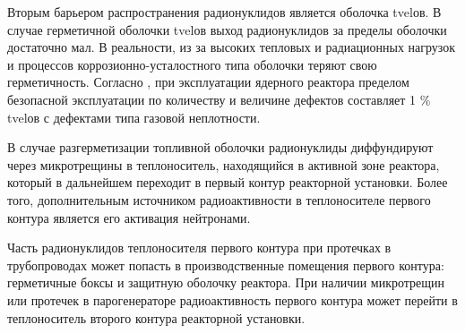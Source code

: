 Вторым барьером распространения радионуклидов является оболочка \ac{tvel}ов. В случае герметичной оболочки \ac{tvel}ов 
выход радионуклидов за пределы оболочки достаточно мал. В реальности, из за высоких тепловых и радиационных нагрузок и 
процессов коррозионно-усталостного типа оболочки теряют свою герметичность. Согласно \cite{kolpakov_tvel}, при 
эксплуатации ядерного реактора пределом безопасной эксплуатации по количеству и величине дефектов составляет 1 \% 
\ac{tvel}ов с дефектами типа газовой неплотности.

В случае разгерметизации топливной оболочки радионуклиды диффундируют через микротрещины в теплоноситель, находящийся 
в активной зоне реактора, который в дальнейшем переходит в первый контур реакторной установки. Более того, 
дополнительным источником радиоактивности в теплоносителе первого контура является его активация нейтронами. 

Часть радионуклидов теплоносителя первого контура при протечках в трубопроводах может попасть в производственные 
помещения первого контура: герметичные боксы и защитную оболочку реактора. При наличии микротрещин или протечек в 
парогенераторе радиоактивность первого контура может перейти в теплоноситель второго контура реакторной установки.

